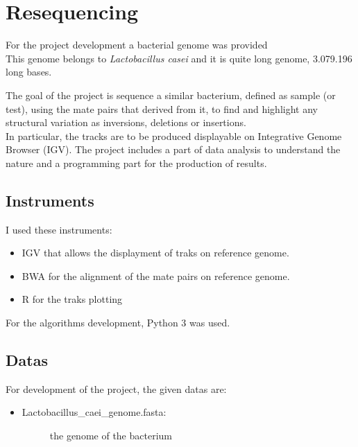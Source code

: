 
\chapter{Resequencing}
\label{cap:resequencing}

For the project development a bacterial genome was provided\\

This genome belongs to \emph{Lactobacillus casei} and it is quite long genome, 3.079.196 long bases.

The goal of the project is sequence a similar bacterium, defined as sample (or test), using the mate pairs that derived from it, to find and highlight any structural variation as inversions, deletions or insertions.\\
In particular, the tracks are to be produced displayable on Integrative Genome Browser (IGV).
The project includes a part of data analysis to understand the nature and a programming part for the production of results.

\section{Instruments}

I used these instruments:
\begin{itemize}
\item IGV that allows the displayment of traks on reference genome.
\item BWA for the alignment of the mate pairs on reference genome.
\item R for the traks plotting
\end{itemize}

For the algorithms development, Python 3 was used.

\section{Datas}

For development of the project, the given datas are:\\
    

\begin{itemize}
\item \begin{description}
		\item[Lactobacillus\_caei\_genome.fasta:] the genome of the bacterium
	  \end{description}
\end{itemize}

